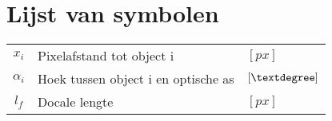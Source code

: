  \chapter*{Lijst van symbolen}

 \begin{table}[!h]
 	\begin{tabular}{cll}
 		$x_i$ & Pixelafstand tot object i & $[px]$\\
 		$\alpha_i$ & Hoek tussen object i en optische as & $[\textdegree]$\\
 		$l_f$ & Docale lengte & $[px]$\\
 	\end{tabular}
 \end{table}



